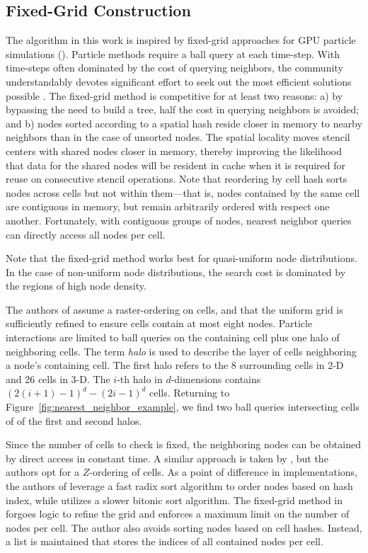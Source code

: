 \documentclass{report}
\begin{document}
\subsection{Fixed-Grid Construction}
The algorithm in this work is inspired by fixed-grid approaches for GPU particle simulations (\cite{Krog2010,Green2010,Johnson2011}). Particle methods require a ball query at each time-step. With time-steps often dominated by the cost of querying neighbors, the community understandably devotes significant effort to seek out the most efficient solutions possible \cite{Goswami2010}. The fixed-grid method is competitive for at least two reasons: a) by bypassing the need to build a tree, half the cost in querying neighbors is avoided; and b) nodes sorted according to a spatial hash reside closer in memory to nearby neighbors than in the case of unsorted nodes. The spatial locality moves stencil centers with shared nodes closer in memory, thereby improving the likelihood that data for the shared nodes will be resident in cache when it is required for reuse on consecutive stencil operations. 
Note that reordering by cell hash sorts nodes across cells but not within them---that is, nodes contained by the same cell are contiguous in memory, but remain arbitrarily ordered with respect one another. Fortunately, with contiguous groups of nodes, nearest neighbor queries can directly access all nodes per cell. 

Note that the fixed-grid method works best for quasi-uniform node distributions. In the case of non-uniform node distributions, the search cost is dominated by the regions of high node density.


The authors of \cite{Krog2010,Johnson2011,Green2010} assume a raster-ordering on cells, and that the uniform grid is sufficiently refined to ensure cells contain at most eight nodes. Particle interactions are limited to ball queries on the containing cell plus one halo of neighboring cells. The term \emph{halo} is used to describe the layer of cells neighboring a node's containing cell. The first halo refers to the 8 surrounding cells in 2-D and 26 cells in 3-D. The $i$-th halo in $d$-dimensions contains $\left(2(i+1)-1\right)^d - \left(2i - 1\right)^d$ cells. Returning to Figure~\ref{fig:nearest_neighbor_example}, we find two ball queries intersecting cells of of the first and second halos.


Since the number of cells to check is fixed, the neighboring nodes can be obtained by direct access in constant time. A similar approach is taken by \cite{Goswami2010}, but the authors opt for a $Z$-ordering of cells. 
 As a point of difference in implementations, the authors of \cite{Green2010, Krog2010, Goswami2010} leverage a fast radix sort algorithm to order nodes based on hash index, while \cite{Johnson2011} utilizes a slower bitonic sort algorithm. The fixed-grid method in \cite{Wendland2002,WendlandBook} forgoes logic to refine the grid and enforces a maximum limit on the number of nodes per cell. The author also avoids sorting nodes based on cell hashes. Instead, a list is maintained that stores the indices of all contained nodes per cell. %
\end{document}
